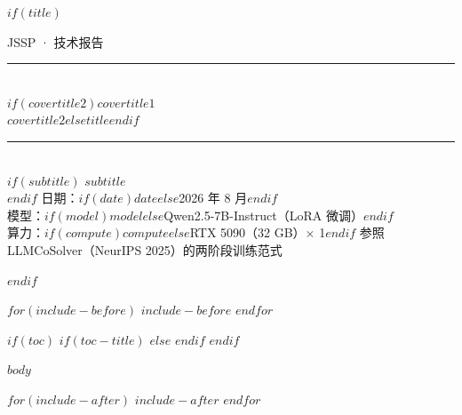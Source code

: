 \documentclass[11pt,a4paper]{article}
\begin{document}
$if(title)$
\begin{titlepage}
\thispagestyle{empty}
\centering
\vspace*{2.2cm}
{\small\sffamily\color{metagray} JSSP · 技术报告}\\[2.6em]
{\color{dblue}\rule{0.42\linewidth}{1.6pt}}\\[2.2em]
{\fontsize{26}{38}\selectfont\bfseries\sffamily\color{dblue}
$if(covertitle2)$$covertitle1$\\[0.15em]$covertitle2$$else$$title$$endif$}\\[2.2em]
{\color{dblue}\rule{0.42\linewidth}{1.6pt}}\\[2.0em]
$if(subtitle)$
{\large\sffamily\color{black!70} $subtitle$}\\[3.4em]
$endif$
{\normalsize\sffamily
日期：$if(date)$$date$$else$2026 年 8 月$endif$\\[0.9em]
模型：$if(model)$$model$$else$Qwen2.5-7B-Instruct（LoRA 微调）$endif$\\[0.9em]
算力：$if(compute)$$compute$$else$RTX 5090（32 GB）× 1$endif$}
\vfill
{\small\sffamily\color{metagray} 参照 LLMCoSolver（NeurIPS 2025）的两阶段训练范式}
\end{titlepage}
\newpage
$endif$

$for(include-before)$
$include-before$
$endfor$

$if(toc)$
$if(toc-title)$
\renewcommand*\contentsname{$toc-title$}
$else$
\renewcommand*\contentsname{\sffamily\bfseries\color{dblue}目录}
$endif$
{\setlength{\parskip}{0pt}%
\setcounter{tocdepth}{$if(toc-depth)$$toc-depth$$else$2$endif$}%
\tableofcontents}
\newpage
$endif$

$body$

$for(include-after)$
$include-after$
$endfor$
\end{document}
